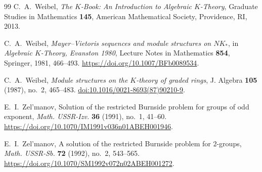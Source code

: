 \begin{thebibliography}{99}
C.~A.~Weibel,
\emph{The $K$-Book: An Introduction to Algebraic $K$-Theory},
Graduate Studies in Mathematics \textbf{145},
American Mathematical Society, Providence, RI, 2013.

C.~A.~Weibel,
\emph{Mayer--Vietoris sequences and module structures on $NK_*$},
in \emph{Algebraic $K$-Theory, Evanston 1980},
Lecture Notes in Mathematics \textbf{854}, Springer, 1981, 466--493.
\url{https://doi.org/10.1007/BFb0089534}.

C.~A.~Weibel,
\emph{Module structures on the $K$-theory of graded rings},
J. Algebra \textbf{105} (1987), no.~2, 465--483.
\href{https://doi.org/10.1016/0021-8693(87)90210-9}{doi:10.1016/0021-8693(87)90210-9}.

E.~I.~Zel'manov,
Solution of the restricted Burnside problem for groups of odd exponent,
\emph{Math. USSR-Izv.} \textbf{36} (1991), no.~1, 41--60.
\url{https://doi.org/10.1070/IM1991v036n01ABEH001946}.

E.~I.~Zel'manov,
A solution of the restricted Burnside problem for $2$-groups,
\emph{Math. USSR-Sb.} \textbf{72} (1992), no.~2, 543--565.
\url{https://doi.org/10.1070/SM1992v072n02ABEH001272}.

\end{thebibliography}
